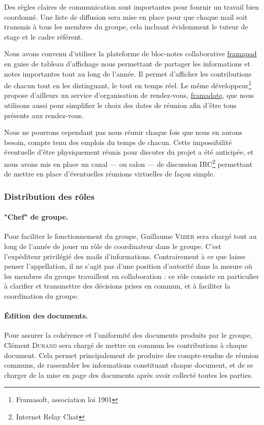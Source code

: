 \documentclass[a4paper, 12pt,twoside]{article}
\begin{document}
		Des règles claires de communication sont importantes pour fournir un travail bien coordonné. Une liste de diffusion sera mise en place pour que chaque mail soit transmis à tous les membres du groupe, cela incluant évidemment le tuteur de stage et le cadre référent.
		
		Nous avons convenu d'utiliser la plateforme de bloc-notes collaborative \href{https://framapad.org}{framapad} en guise de tableau d'affichage nous permettant de partager les informations et notes importantes tout au long de l'année. Il permet d'afficher les contributions de chacun tout en les distinguant, le tout en temps réel. Le même développeur\footnote{Framasoft, association loi 1901} propose d'ailleurs un service d'organisation de rendez-vous, \href{https://framadate.org}{framadate}, que nous utilisons aussi pour simplifier le choix des dates de réunion afin d'être tous présents aux rendez-vous.
		
		Nous ne pourrons  cependant pas nous réunir chaque fois que nous en aurons besoin, compte tenu des emplois du temps de chacun. Cette impossibilité éventuelle d'être physiquement réunis pour discuter du projet a été anticipée, et nous avons mis en place un canal — ou salon — de discussion IRC\footnote{Internet Relay Chat} permettant de mettre en place d'éventuelles réunions virtuelles de façon simple.
				
		\subsubsection{Distribution des rôles}
		
		\paragraph{"Chef" de groupe. } Pour faciliter le fonctionnement du groupe, \textcolor{bleu303}{Guillaume \textsc{Vizier}} sera chargé tout au long de l'année de jouer un rôle de coordinateur dans le groupe. C'est l'expéditeur privilégié des mails d'informations. Contrairement à ce que laisse penser l'appellation, il ne s'agit pas d'une position d'autorité dans la mesure où les membres du groupe travaillent en collaboration : ce rôle consiste en particulier à clarifier et transmettre des décisions prises en commun, et à faciliter la coordination du groupe.
		
		\paragraph{Édition des documents. } Pour assurer la cohérence et l'uniformité des documents produits par le groupe, \textcolor{bleu303}{Clément \textsc{Durand}} sera chargé de mettre en commun les contributions à chaque document. Cela permet principalement de produire des compte-rendus de réunion communs, de rassembler les informations constituant chaque document, et de se charger de la mise en page des documents après avoir collecté toutes les parties.
		
\end{document}
